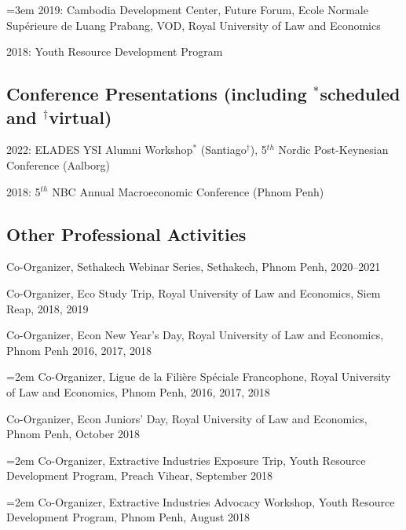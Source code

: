\documentclass[10pt,a4paper]{article}
\begin{document}
\hangindent=3em
	2019: Cambodia Development Center, Future Forum, Ecole Normale Supérieure de Luang Prabang, VOD, Royal University of Law and Economics

	2018: Youth Resource Development Program
	
\subsection*{Conference Presentations (including $^\ast$scheduled and $^\dag$virtual)}


	2022:  ELADES YSI Alumni Workshop$^\ast$ (Santiago$^\dag$), 5$^{th}$ Nordic Post-Keynesian Conference (Aalborg)

	2018: 5$^{th}$ NBC Annual Macroeconomic Conference (Phnom Penh)

\subsection*{Other Professional Activities}

	Co-Organizer, Sethakech Webinar Series, Sethakech, Phnom Penh, 2020--2021

	Co-Organizer, Eco Study Trip, Royal University of Law and Economics, Siem Reap, 2018, 2019

	Co-Organizer, Econ New Year's Day, Royal University of Law and Economics, Phnom Penh 2016, 2017, 2018

\hangindent=2em
	Co-Organizer, Ligue de la Filière Spéciale Francophone, Royal University of Law and Economics, Phnom Penh, 2016, 2017, 2018 
		
	Co-Organizer, Econ Juniors' Day, Royal University of Law and Economics, Phnom Penh, October 2018
		
\hangindent=2em
	Co-Organizer, Extractive Industries Exposure Trip, Youth Resource Development Program, Preach Vihear, September 2018

\hangindent=2em
	Co-Organizer, Extractive Industries Advocacy Workshop, Youth Resource Development Program, Phnom Penh, August 2018
		
\end{document}
